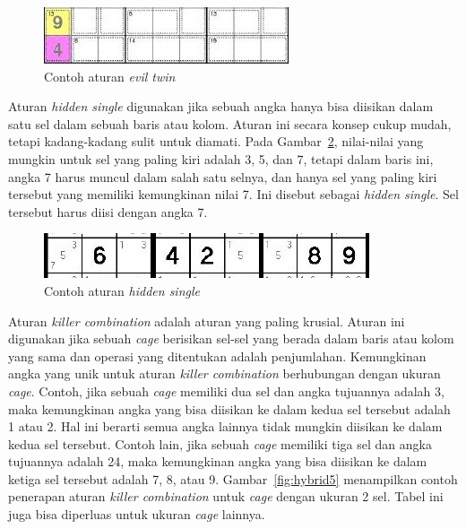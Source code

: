 \documentclass[a4paper,twoside]{article}
\begin{document}
\begin{enumerate}
\begin{figure}
\centering
\captionsetup{justification=centering}
\includegraphics[scale=1]{Gambar/HybridGenetic3}
\caption[Contoh aturan  \textit{evil twin}  ~\cite{JohannaLukasSaputra}]{Contoh aturan  \textit{evil twin}  ~\cite{JohannaLukasSaputra}}
\label{fig:hybrid3}
\end{figure}

Aturan \textit{hidden single} digunakan jika sebuah angka hanya bisa diisikan dalam satu sel dalam sebuah baris atau kolom. Aturan ini secara konsep cukup mudah, tetapi kadang-kadang sulit untuk diamati. Pada Gambar~\ref{fig:hybrid4}, nilai-nilai yang mungkin untuk sel yang paling kiri adalah 3, 5, dan 7, tetapi dalam baris ini, angka 7 harus muncul dalam salah satu selnya, dan hanya sel yang paling kiri tersebut yang memiliki kemungkinan nilai 7. Ini disebut sebagai \textit{hidden single}. Sel tersebut harus diisi dengan angka 7.

\begin{figure}
\centering
\captionsetup{justification=centering}
\includegraphics[scale=1]{Gambar/HybridGenetic4}
\caption[Contoh aturan  \textit{hidden single}  ~\cite{JohannaLukasSaputra}]{Contoh aturan  \textit{hidden single}  ~\cite{JohannaLukasSaputra}}
\label{fig:hybrid4}
\end{figure}

Aturan \textit{killer combination} adalah aturan yang paling krusial. Aturan ini digunakan jika sebuah \textit{cage} berisikan sel-sel yang berada dalam baris atau kolom yang sama dan operasi yang ditentukan adalah penjumlahan. Kemungkinan angka yang unik untuk aturan \textit{killer combination} berhubungan dengan ukuran \textit{cage}. Contoh, jika sebuah \textit{cage} memiliki dua sel dan angka tujuannya adalah 3, maka kemungkinan angka yang bisa diisikan ke dalam kedua sel tersebut adalah 1 atau 2. Hal ini berarti semua angka lainnya tidak mungkin diisikan ke dalam kedua sel tersebut. Contoh lain, jika sebuah \textit{cage} memiliki tiga sel dan angka tujuannya adalah 24, maka kemungkinan angka yang bisa diisikan ke dalam ketiga sel tersebut adalah 7, 8, atau 9. Gambar~\ref{fig:hybrid5} menampilkan contoh penerapan aturan \textit{killer combination} untuk \textit{cage} dengan ukuran 2 sel. Tabel ini juga bisa diperluas untuk ukuran \textit{cage} lainnya.


\end{enumerate}
\end{document}
